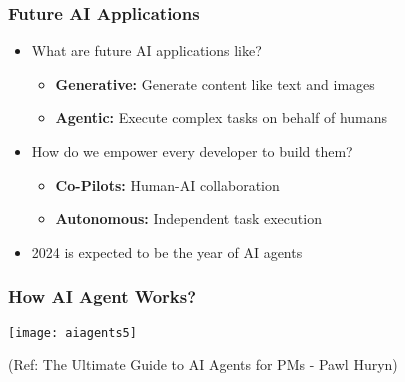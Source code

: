 \begin{frame}[fragile]\frametitle{Future AI Applications}
\begin{itemize}
    \item What are future AI applications like?
    \begin{itemize}
        \item \textbf{Generative:} Generate content like text and images
        \item \textbf{Agentic:} Execute complex tasks on behalf of humans
    \end{itemize}
    \item How do we empower every developer to build them?
    \begin{itemize}
        \item \textbf{Co-Pilots:} Human-AI collaboration
        \item \textbf{Autonomous:} Independent task execution
    \end{itemize}
    \item 2024 is expected to be the year of AI agents
\end{itemize}
\end{frame}


\begin{frame}[fragile]\frametitle{How AI Agent Works?}

	\begin{center}
	\texttt{[image: aiagents5]}
	\end{center}
	
	{\tiny (Ref: The Ultimate Guide to AI Agents for PMs - Pawl Huryn)}
	
\end{frame}


